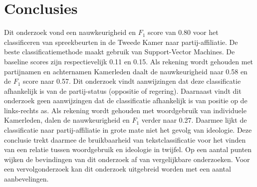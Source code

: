 \section{Conclusies}
\label{sec:conc}

Dit onderzoek vond een nauwkeurigheid en $F_1$ score van 0.80 voor het classificeren van spreekbeurten in de Tweede Kamer naar partij-affiliatie. De beste classificatiemethode maakt gebruik van Support-Vector Machines. De baseline scores zijn respectievelijk 0.11 en 0.15. Als rekening wordt gehouden met partijnamen en achternamen Kamerleden daalt de nauwkeurigheid naar 0.58 en de $F_1$ score naar 0.57. Dit onderzoek vindt aanwijzingen dat deze classificatie afhankelijk is van de partij-status (oppositie of regering). Daarnaast vindt dit onderzoek geen aanwijzingen dat de classificatie afhankelijk is van positie op de links-rechts as. Als rekening wordt gehouden met woordgebruik van individuele Kamerleden, dalen de nauwkeurigheid en $F_1$ verder naar 0.27. Daarmee lijkt de classificatie naar partij-affiliatie in grote mate niet het gevolg van ideologie. Deze conclusie trekt daarmee de bruikbaarheid van tekstclassificatie voor het vinden van een relatie tussen woordgebruik en ideologie in twijfel. Op een aantal punten wijken de bevindingen van dit onderzoek af van vergelijkbare onderzoeken. Voor een vervolgonderzoek kan dit onderzoek uitgebreid worden met een aantal aanbevelingen.
